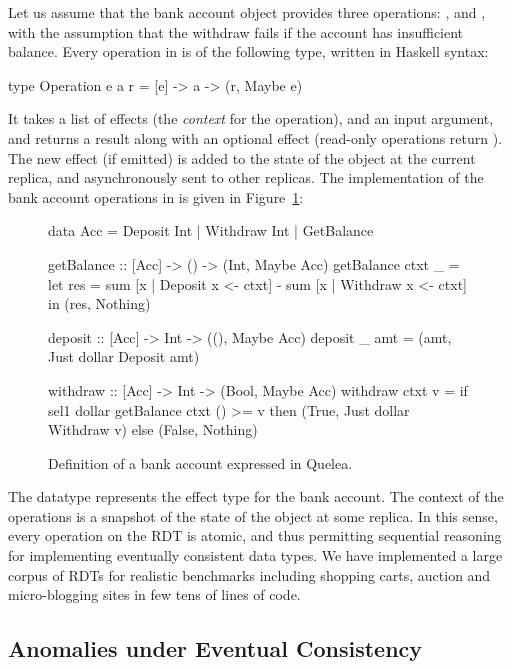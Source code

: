Let us assume that the bank account object provides three operations:
,  and , with the assumption that the
withdraw fails if the account has insufficient balance. Every operation in
\quelea is of the following type, written in Haskell syntax:

\begin{codehaskell}
type Operation e a r = [e] -> a -> (r, Maybe e)
\end{codehaskell}

\noindent It takes a list of effects (the \emph{context} for the operation),
and an input argument, and returns a result along with an optional effect
(read-only operations return ). The new effect (if emitted) is
added to the state of the object at the current replica, and asynchronously
sent to other replicas. The implementation of the bank account operations in
\quelea is given in Figure~\ref{fig:ex}:

\begin{figure}
\begin{codehaskell}
data Acc = Deposit Int | Withdraw Int | GetBalance

getBalance :: [Acc] -> () -> (Int, Maybe Acc)
getBalance ctxt _ =
  let res = sum [x | Deposit x <- ctxt]
						- sum [x | Withdraw x <- ctxt]
	in (res, Nothing)

deposit :: [Acc] -> Int -> ((), Maybe Acc)
deposit _ amt = (amt, Just dollar Deposit amt)

withdraw :: [Acc] -> Int -> (Bool, Maybe Acc)
withdraw ctxt v =
	if sel1 dollar getBalance ctxt () >= v
  then (True, Just dollar Withdraw v)
	else (False, Nothing)
\end{codehaskell}
\caption{Definition of a bank account expressed in Quelea.}
\label{fig:ex}
\end{figure}

The datatype  represents the effect type for the bank account. The
context of the operations is a snapshot of the state of the object at some
replica. In this sense, every operation on the RDT is atomic, and thus
permitting sequential reasoning for implementing eventually consistent data
types. We have implemented a large corpus of RDTs for realistic benchmarks
including shopping carts, auction and micro-blogging sites in few tens of lines
of code.

\subsection{Anomalies under Eventual Consistency}

